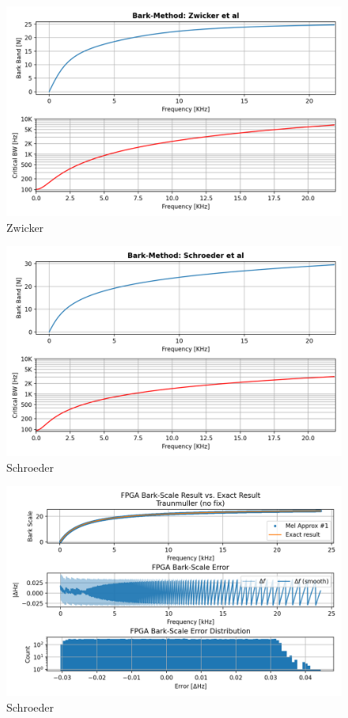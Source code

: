 \begin{figure}[H]
    \centering
    \includegraphics[width=0.75\linewidth]{Experiments/images/Zwicker}
    \caption{Zwicker}\label{fig:Zwicker}
\end{figure}

\begin{figure}[H]
    \centering
    \includegraphics[width=0.75\linewidth]{Experiments/images/Schroeder}
    \caption{Schroeder}\label{fig:Schroeder}
\end{figure}


\begin{figure}[H]
    \centering
    \includegraphics[width=0.75\linewidth]{Scaling/images/bark_traunmuller_no_fix}
    \caption{Schroeder}\label{fig:bark_traunmuller_no_fix}
\end{figure}

